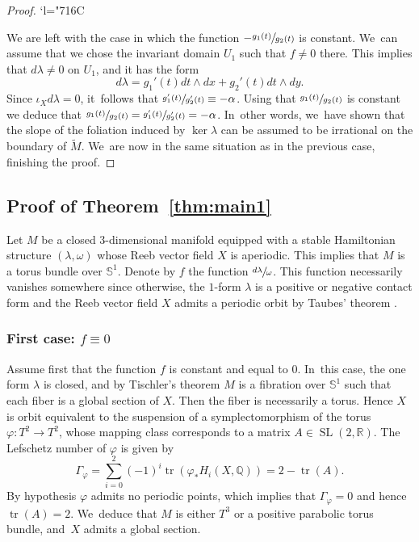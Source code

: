 \documentclass[10pt]{amsart}
\newcommand{\Changelback}{\mathcode`l="716C}
\DeclareMathOperator{\SL}{SL}
\theoremstyle{definition}
\newcommand{\mS}{\mathbb{S}}
\begin{document}
\begin{proof}
\Changelback

We are left with the case in which the function $-\sfrac{g_1(t)}{g_2(t)}$ is constant. We~can assume that we chose the invariant domain $U_1$ such that $f\neq 0$ there. This implies that $d\lambda \neq 0$ on $U_1$, and it has the form
\[
d\lambda= g_1'(t) dt\wedge dx + g_2'(t) dt\wedge dy.
\]
Since $\iota_Xd\lambda=0$, it~follows that $\sfrac{g_1'(t)}{g_2'(t)}\equiv -\alpha$. Using that $\sfrac{g_1(t)}{g_2(t)}$ is constant we deduce that $\sfrac{g_1(t)}{g_2(t)}=\sfrac{g_1'(t)}{g_2'(t)}=-{\alpha}$. In~other words, we~have shown that the slope of the foliation induced by $\ker \lambda$ can be assumed to be irrational on the boundary of $\widetilde M$. We~are now in the same situation as in the previous case, finishing the proof.
\end{proof}

\subsection{Proof of Theorem~\ref{thm:main1}}\label{ss:Tisch}

Let $M$ be a closed 3-dimensional manifold equipped with a stable Hamiltonian structure $(\lambda, \omega)$ whose Reeb vector field $X$ is aperiodic. This implies that $M$ is a torus bundle over $\mS^1$. Denote by $f$ the function $\sfrac{d\lambda}{\omega}$. This function necessarily vanishes somewhere since otherwise, the $1$-form $\lambda$ is a positive or negative contact form and the Reeb vector field $X$ admits a periodic orbit by Taubes' theorem
\cite{Taub}.

\subsubsection*{First case: $f\equiv 0$}
Assume first that the function $f$ is constant and equal to $0$. In~this case, the one form $\lambda$ is closed, and by Tischler's theorem \cite{Tis} $M$ is a fibration over $\mS^1$ such that each fiber is a global section of $X$. Then the fiber is necessarily a torus. Hence $X$ is orbit equivalent to the suspension of a symplectomorphism of the torus $\varphi:T^2\to T^2$, whose mapping class corresponds to a matrix $A\in \SL(2,\mathbb{R})$.
The Lefschetz number of $\varphi$ is given by
\begin{equation*}
\Gamma_{\varphi}=\sum_{i=0}^2 (-1)^i\operatorname{tr}(\varphi_*H_i(X,\mathbb{Q}))
								=2- \operatorname{tr}(A).
\end{equation*}
By hypothesis $\varphi$ admits no periodic points, which implies that $\Gamma_{\varphi}=0$ and hence $\operatorname{tr}(A)=2$. We~deduce that $M$ is either $T^3$ or a positive parabolic torus bundle, and~$X$ admits a global section.
\end{document}
